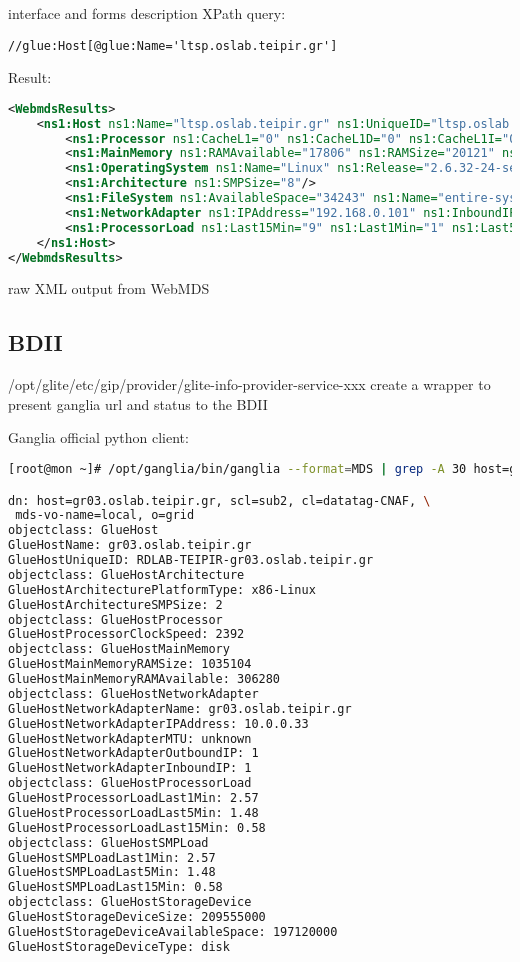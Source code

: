 interface and forms description
XPath query:
\begin{verbatim}
//glue:Host[@glue:Name='ltsp.oslab.teipir.gr']
\end{verbatim}
Result:
\begin{lstlisting}[language=XML,caption=WebMDS results from XPath query]
<WebmdsResults>
	<ns1:Host ns1:Name="ltsp.oslab.teipir.gr" ns1:UniqueID="ltsp.oslab.teipir.gr">
		<ns1:Processor ns1:CacheL1="0" ns1:CacheL1D="0" ns1:CacheL1I="0" ns1:CacheL2="0" ns1:ClockSpeed="1600" ns1:InstructionSet="x86_64"/>
		<ns1:MainMemory ns1:RAMAvailable="17806" ns1:RAMSize="20121" ns1:VirtualAvailable="22137" ns1:VirtualSize="24508"/>
		<ns1:OperatingSystem ns1:Name="Linux" ns1:Release="2.6.32-24-server"/>
		<ns1:Architecture ns1:SMPSize="8"/>
		<ns1:FileSystem ns1:AvailableSpace="34243" ns1:Name="entire-system" ns1:ReadOnly="false" ns1:Root="/" ns1:Size="251687"/>
		<ns1:NetworkAdapter ns1:IPAddress="192.168.0.101" ns1:InboundIP="true" ns1:MTU="0" ns1:Name="ltsp.oslab.teipir.gr" ns1:OutboundIP="true"/>
		<ns1:ProcessorLoad ns1:Last15Min="9" ns1:Last1Min="1" ns1:Last5Min="9"/>
	</ns1:Host>
</WebmdsResults>
\end{lstlisting}
raw XML output from WebMDS

\subsection{BDII}
/opt/glite/etc/gip/provider/glite-info-provider-service-xxx
create a wrapper to present ganglia url and status to the BDII

Ganglia official python client:
\begin{lstlisting}[language=bash,caption=Python Ganglia client MDS export]
[root@mon ~]# /opt/ganglia/bin/ganglia --format=MDS | grep -A 30 host=gr03

dn: host=gr03.oslab.teipir.gr, scl=sub2, cl=datatag-CNAF, \
 mds-vo-name=local, o=grid
objectclass: GlueHost
GlueHostName: gr03.oslab.teipir.gr
GlueHostUniqueID: RDLAB-TEIPIR-gr03.oslab.teipir.gr
objectclass: GlueHostArchitecture
GlueHostArchitecturePlatformType: x86-Linux
GlueHostArchitectureSMPSize: 2
objectclass: GlueHostProcessor
GlueHostProcessorClockSpeed: 2392
objectclass: GlueHostMainMemory
GlueHostMainMemoryRAMSize: 1035104
GlueHostMainMemoryRAMAvailable: 306280
objectclass: GlueHostNetworkAdapter
GlueHostNetworkAdapterName: gr03.oslab.teipir.gr
GlueHostNetworkAdapterIPAddress: 10.0.0.33
GlueHostNetworkAdapterMTU: unknown
GlueHostNetworkAdapterOutboundIP: 1
GlueHostNetworkAdapterInboundIP: 1
objectclass: GlueHostProcessorLoad
GlueHostProcessorLoadLast1Min: 2.57
GlueHostProcessorLoadLast5Min: 1.48
GlueHostProcessorLoadLast15Min: 0.58
objectclass: GlueHostSMPLoad
GlueHostSMPLoadLast1Min: 2.57
GlueHostSMPLoadLast5Min: 1.48
GlueHostSMPLoadLast15Min: 0.58
objectclass: GlueHostStorageDevice
GlueHostStorageDeviceSize: 209555000
GlueHostStorageDeviceAvailableSpace: 197120000
GlueHostStorageDeviceType: disk
\end{lstlisting}

